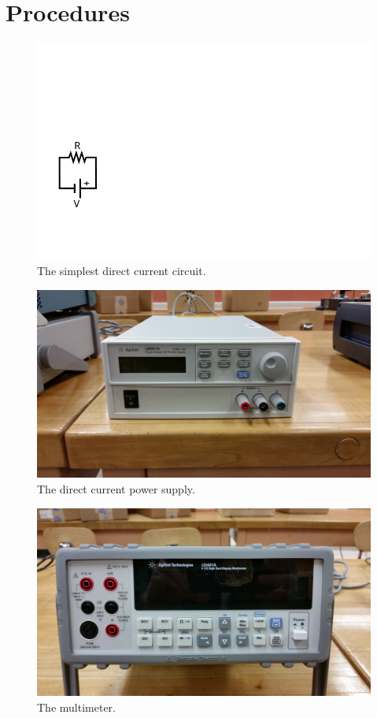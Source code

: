 \documentclass[12pt]{article}
\begin{document}
\section{Procedures}
\label{sec:procedures}

\begin{figure}
  \centering
  \includegraphics[width=\textwidth/5]{figures/simplest}
  \caption{The simplest direct current circuit.}
  \label{fig:simple}
\end{figure}
\begin{figure}
  \centering
\includegraphics[width=\textwidth/2]{figures/agilent_u8001a}
  \caption{The direct current power supply.}
  \label{fig:dcps}
\end{figure}
\begin{figure}
  \centering
    \includegraphics[width=2\textwidth/3]{figures/agilent_u3401a}
  \caption{The multimeter.}
  \label{fig:multimeter}
\end{figure}
\end{document}
